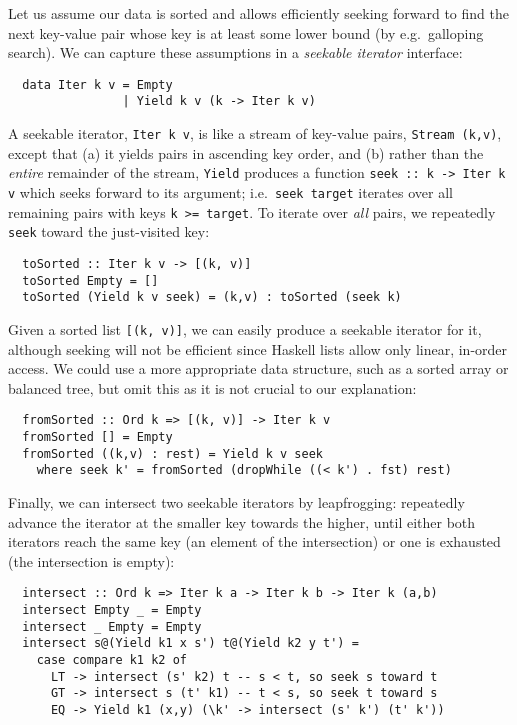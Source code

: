 \documentclass[acmsmall,screen,review,anonymous,dvipsnames]{acmart}
\newcommand\hask[1]{\texttt{#1}}
\begin{document}
Let us assume our data is sorted and allows efficiently seeking forward to find the next key-value pair whose key is at least some lower bound (by e.g.\ galloping search).
We can capture these assumptions in a \emph{seekable iterator} interface:

\begin{verbatim}
  data Iter k v = Empty
                | Yield k v (k -> Iter k v)
\end{verbatim}

\noindent
A seekable iterator, \hask{Iter k v}, is like a stream of key-value pairs, \hask{Stream (k,v)}, except that (a) it yields pairs in ascending key order, and (b) rather than the \emph{entire} remainder of the stream, \hask{Yield} produces a function \hask{seek :: k -> Iter k v} which seeks forward to its argument; i.e.\ \hask{seek target} iterates over all remaining pairs with keys \texttt{k >= target}.
%
To iterate over \emph{all} pairs, we repeatedly \texttt{seek} toward the just-visited key:

\begin{verbatim}
  toSorted :: Iter k v -> [(k, v)]
  toSorted Empty = []
  toSorted (Yield k v seek) = (k,v) : toSorted (seek k)
\end{verbatim}

\noindent
Given a sorted list \hask{[(k, v)]}, we can easily produce a seekable iterator for it, although seeking will not be efficient since Haskell lists allow only linear, in-order access.
We could use a more appropriate data structure, such as a sorted array or balanced tree, but omit this as it is not crucial to our explanation:

\begin{verbatim}
  fromSorted :: Ord k => [(k, v)] -> Iter k v
  fromSorted [] = Empty
  fromSorted ((k,v) : rest) = Yield k v seek
    where seek k' = fromSorted (dropWhile ((< k') . fst) rest)
\end{verbatim}

\noindent
Finally, we can intersect two seekable iterators by leapfrogging: repeatedly advance the iterator at the smaller key towards the higher, until either both iterators reach the same key (an element of the intersection) or one is exhausted (the intersection is empty):

\begin{verbatim}
  intersect :: Ord k => Iter k a -> Iter k b -> Iter k (a,b)
  intersect Empty _ = Empty
  intersect _ Empty = Empty
  intersect s@(Yield k1 x s') t@(Yield k2 y t') =
    case compare k1 k2 of
      LT -> intersect (s' k2) t -- s < t, so seek s toward t
      GT -> intersect s (t' k1) -- t < s, so seek t toward s
      EQ -> Yield k1 (x,y) (\k' -> intersect (s' k') (t' k'))
\end{verbatim}
\end{document}
